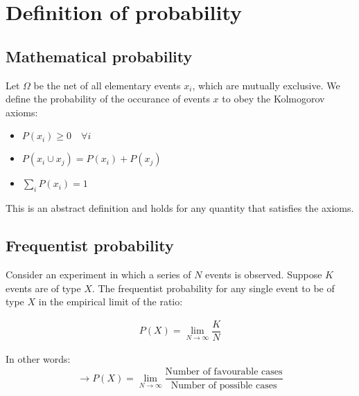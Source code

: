 

\section{Definition of probability}
\label{sec:def_of_prob}

\subsection{Mathematical probability}
Let $\Omega$ be the net of all elementary events $x_i$, which are mutually exclusive. We define the probability of the occurance of events $x$ to obey the Kolmogorov axioms:

\begin{itemize}
    \item $P(x_i) \geq 0 \quad \forall i$ 
    \item $P(x_i \cup x_j) = P(x_i) + P(x_j)$
    \item $\sum\limits_i P(x_i) = 1 $
\end{itemize}

This is an abstract definition and holds for any quantity that satisfies the axioms.

\subsection{Frequentist probability}

Consider an experiment in which a series of $N$ events is observed. Suppose $K$ events are of type $X$. The frequentist probability for any single event to be of type $X$ in the empirical limit of the ratio: 

\begin{align}
    P(X) = \lim_{N\to\infty} \dfrac{K}{N}
\end{align}

In other words: 
\begin{align}
   \to P(X) = \lim_{N\to\infty} \dfrac{\text{Number of favourable cases}}{\text{Number of possible cases}}
\end{align}

